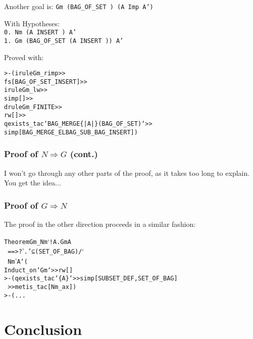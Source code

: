 \documentclass[english,svgnames,hide notes,12pt]{beamer}
\theoremstyle{definition}
\theoremstyle{remark}
\begin{document}
\begin{frame}
    Another goal is:
    \texttt{Gm (BAG_OF_SET \textGamma) (A Imp A')}

    With Hypotheses:\\
    \texttt{0.  Nm (A INSERT \textGamma) A'\\
         1.  Gm (BAG_OF_SET (A INSERT \textGamma)) A' }

     Proved with:
     \begin{alltt}
         >- (irule Gm_rimp >>\\
             fs[BAG_OF_SET_INSERT] >>\\
             irule Gm_lw >>\\
             simp[] >>\\
             drule Gm_FINITE >>\\
             rw[] >>\\
             qexists_tac `BAG_MERGE \{|A|\} (BAG_OF_SET \textGamma)` >>\\
             simp[BAG_MERGE_ELBAG_SUB_BAG_INSERT])
     \end{alltt}
\end{frame}

\begin{frame}
    \frametitle{Proof of $N\Rightarrow G$ (cont.)}
    I won't go through any other parts of the proof, as it takes too long to explain. You get the idea...
\end{frame}

\begin{frame}
    \frametitle{Proof of $G\Rightarrow N$}
    The proof in the other direction proceeds in a similar fashion:
    \begin{alltt}
        Theorem Gm_Nm `!\textGamma A. Gm \textGamma A\\
        ~==> ?\textGamma'. \textGamma' ⊆ (SET_OF_BAG \textGamma) /\char`\\\ Nm \textGamma' A` (\\
          Induct_on `Gm` >> rw[]\\
            >- (qexists_tac `\{A\}` >> simp[SUBSET_DEF,SET_OF_BAG]\\ 
            ~>> metis_tac[Nm_ax])\\
            >- (...
    \end{alltt}

\end{frame}

\section{Conclusion}
\end{document}
